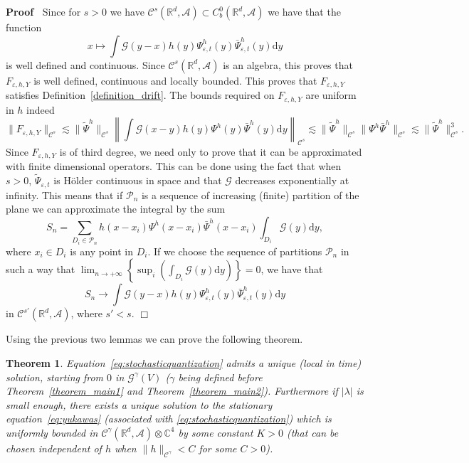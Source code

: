 \documentclass{article}
\newcommand{\mathd}{\mathrm{d}}
\newenvironment{proof}{\noindent\textbf{Proof\ }}{\hspace*{\fill}$\Box$\medskip}
\newtheorem{theorem}{Theorem}
\begin{document}
\begin{proof}
  Since for $s > 0$ we have $\mathcal{C}^s (\mathbb{R}^d, \mathcal{A}) \subset
  C^0_b (\mathbb{R}^d, \mathcal{A})$ we have that the function
  \[ x \mapsto \int \mathcal{G} (y - x) h (y) \Psi_{\varepsilon, t}^h (y)
     \bar{\Psi}_{\varepsilon, t}^h (y) \mathd y \]
  is well defined and continuous. Since $\mathcal{C}^s (\mathbb{R}^d,
  \mathcal{A})$ is an algebra, this proves that $F_{\varepsilon, h, Y}$ is
  well defined, continuous and locally bounded. This proves that
  $F_{\varepsilon, h, Y}$ satisfies Definition~\ref{definition_drift}. The
  bounds required on $F_{\varepsilon, h, Y}$ are uniform in $h$ indeed
  \[ \| F_{\varepsilon, h, Y} \|_{\mathcal{C}^s} \lesssim \| \tilde{\Psi}^h
     \|_{\mathcal{C}^s} \left\| \int \mathcal{G} (x - y) h (y) \Psi^h (y)
     \bar{\Psi}^h (y) \mathd y \right\|_{\mathcal{C}^s} \lesssim \|
     \tilde{\Psi}^h \|_{\mathcal{C}^s} \| \Psi^h \bar{\Psi}^h
     \|_{\mathcal{C}^s} \lesssim \| \tilde{\Psi}^h \|_{\mathcal{C}^s}^3 . \]
  Since $F_{\varepsilon, h, Y}$ is of third degree, we need only to prove that
  it can be approximated with finite dimensional operators. This can be done
  using the fact that when $s > 0$, $\tilde{\Psi}_{\varepsilon, t}$ is
  H{\"o}lder continuous in space and that $\mathcal{G}$ decreases
  exponentially at infinity. This means that if $\mathcal{P}_n$ is a sequence
  of increasing (finite) partition of the plane we can approximate the
  integral by the sum
  \[ S_n = \sum_{D_i \in \mathcal{P}_n} h (x - x_i) \Psi^h (x - x_i)
     \bar{\Psi}^h (x - x_i) \int_{D_i} \mathcal{G} (y) \mathd y, \]
  where $x_i \in D_i$ is any point in $D_i$. If we choose the sequence of
  partitions $\mathcal{P}_n$ in such a way that $\lim_{n \rightarrow + \infty}
  \left\{ \sup_i \left( \int_{D_i} \mathcal{G} (y) \mathd y \right) \right\} =
  0$, we have that
  \[ S_n \rightarrow \int \mathcal{G} (y - x) h (y) \Psi_{\varepsilon, t}^h
     (y) \bar{\Psi}_{\varepsilon, t}^h (y) \mathd y \]
  in $\mathcal{C}^{s'} (\mathbb{R}^d, \mathcal{A})$, where $s' < s$.
\end{proof}

Using the previous two lemmas we can prove the following theorem.

\begin{theorem}
  \label{theorem_main3}Equation~{\eqref{eq:stochasticquantization}} admits a
  unique (local in time) solution, starting from $0$ in $\mathcal{G}^{\gamma}
  (V)$ ($\gamma$ being defined before Theorem~\ref{theorem_main1} and
  Theorem~\ref{theorem_main2}). Furthermore if $| \lambda |$ is small enough,
  there exists a unique solution to the stationary
  equation~{\eqref{eq:yukawas}} (associated with
  {\eqref{eq:stochasticquantization}}) which is uniformly bounded in
  $\mathcal{C}^{\gamma} (\mathbb{R}^d, \mathcal{A}) \otimes \mathbb{C}^4$ by
  some constant $K > 0$ (that can be chosen independent of $h$ when $\| h
  \|_{\mathcal{C}^{\gamma}} < C$ for some $C > 0$).
\end{theorem}
\end{document}
